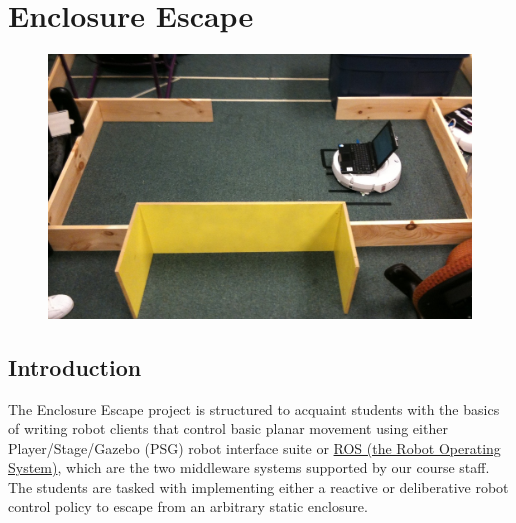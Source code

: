 

\chapter{Enclosure Escape}
\label{sec:enclosure_escape}

\begin{figure}[!h]
\centering
\includegraphics[width=1.0\columnwidth]{figures/5_teaser.jpg}
\end{figure}

\newpage

\section{Introduction}

The Enclosure Escape project is structured to acquaint students with the basics of writing robot clients that control basic planar movement using either Player/Stage/Gazebo (PSG) robot interface suite or \href{http://www.ros.org/wiki/ROS/StartGuide}{ROS (the Robot Operating System)}, which are the two middleware systems supported by our course staff. The students are tasked with implementing either a reactive or deliberative robot control policy to escape from an arbitrary static enclosure.

\vspace{5 mm}

